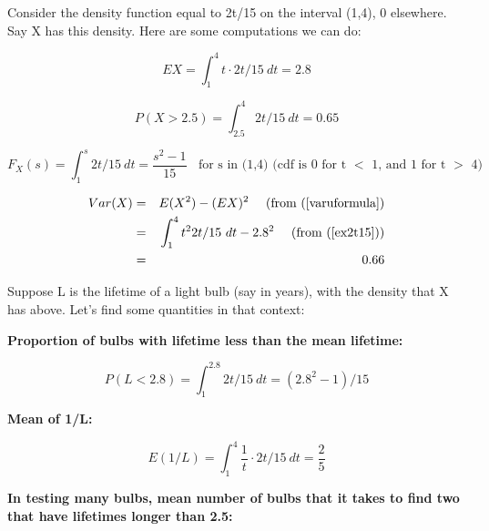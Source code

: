 Consider the density function equal to 2t/15 on the
interval (1,4), 0 elsewhere.  Say X has this density.  Here are some
computations we can do: 

\begin{equation}
\label{ex2t15}
EX = \int_{1}^{4} t \cdot 2t/15 ~ dt = 2.8
\end{equation}

\begin{equation}
P(X > 2.5) = \int_{2.5}^{4} 2t/15 ~ dt = 0.65
\end{equation}

\begin{equation}
F_X(s) = \int_{1}^{s} 2t/15 ~ dt = \frac{s^2-1}{15} ~~~~ \textrm{for s in
(1,4) (cdf is 0 for t $<$ 1, and 1 for t $>$ 4)}
\end{equation}

\begin{eqnarray}
Var(X) &=& E(X^2) - (EX)^2 ~~~~ \textrm{(from (\ref{varuformula})}\\ 
&=& \int_{1}^{4} t^2 2t/15 ~ dt - 2.8^2 ~~~~ \textrm{(from (\ref{ex2t15}))} \\
&=& 0.66
\end{eqnarray}


Suppose L is the lifetime of a light bulb (say in years), with the
density that X has above.  Let's find some quantities in that context:

{\bf  Proportion of bulbs with lifetime less than
the mean lifetime:}

\begin{equation}
P(L < 2.8) = \int_{1}^{2.8} 2t/15 ~ dt = (2.8^2 - 1)/15
\end{equation}

{\bf Mean of 1/L:}

\begin{equation}
E(1/L) = \int_{1}^{4} \frac{1}{t} \cdot 2t/15 ~ dt = \frac{2}{5}
\end{equation}

{\bf In testing many bulbs, mean number of bulbs that it takes to find
two that have lifetimes longer than 2.5:}

